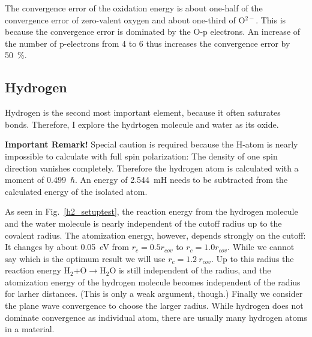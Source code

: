 \documentclass[11pt,a4paper]{report}
\begin{document}
The convergence error of the oxidation energy is about one-half of the
convergence error of zero-valent oxygen and about one-third of
O$^{2-}$. This is because the convergence error is dominated by the
O-p electrons. An increase of the number of p-electrons from 4 to 6
thus increases the convergence error by 50~\%.



\subsection{Hydrogen}
Hydrogen is the second most important element, because it often
saturates bonds. Therefore, I explore the hydrtogen molecule and water
as its oxide.

\textbf{Important Remark!} Special caution is required because the
H-atom is nearly impossible to calculate with full spin polarization:
The density of one spin direction vanishes completely. Therefore the
hydrogen atom is calculated with a moment of 0.499~$\hbar$. An energy
of 2.544~mH needs to be subtracted from the calculated energy of the
isolated atom.

As seen in Fig.~\ref{h2_setuptest}, the reaction energy from the
hydrogen molecule and the water molecule is nearly independent of the
cutoff radius up to the covalent radius. The atomization energy,
however, depends strongly on the cutoff: It changes by about 0.05~eV
from $r_c=0.5 r_{cov}$ to $r_c=1.0 r_{cov}$. While we cannot say which
is the optimum result we will use $r_c=1.2~r_{cov}$. Up to this radius
the reaction energy H$_2$+O$\rightarrow$H$_2$O is still independent of
the radius, and the atomization energy of the hydrogen molecule
becomes independent of the radius for larher distances. (This is only
a weak argument, though.) Finally we consider the plane wave
convergence to choose the larger radius. While hydrogen does not
dominate convergence as individual atom, there are usually many
hydrogen atoms in a material.
\end{document}
